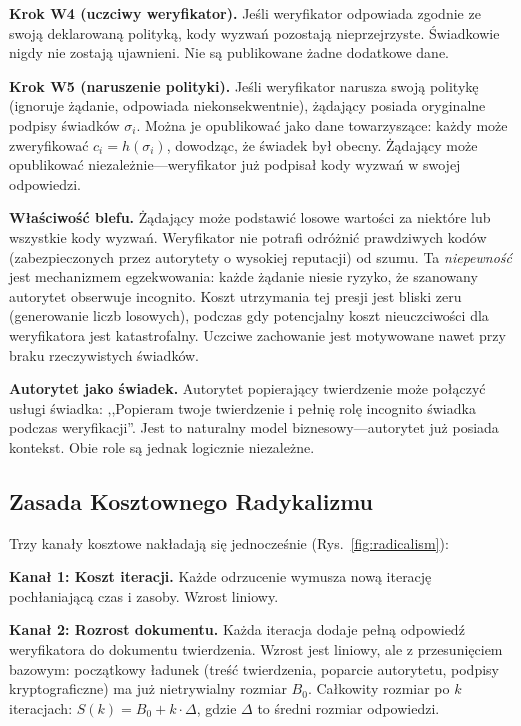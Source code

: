 \documentclass[11pt,a4paper,twocolumn]{article}
\begin{document}
\textbf{Krok W4 (uczciwy weryfikator).} Jeśli weryfikator odpowiada zgodnie ze swoją deklarowaną polityką, kody wyzwań pozostają nieprzejrzyste. Świadkowie nigdy nie zostają ujawnieni. Nie są publikowane żadne dodatkowe dane.

\textbf{Krok W5 (naruszenie polityki).} Jeśli weryfikator narusza swoją politykę (ignoruje żądanie, odpowiada niekonsekwentnie), żądający posiada oryginalne podpisy świadków $\sigma_i$. Można je opublikować jako dane towarzyszące: każdy może zweryfikować $c_i = h(\sigma_i)$, dowodząc, że świadek był obecny. Żądający może opublikować niezależnie---weryfikator już podpisał kody wyzwań w swojej odpowiedzi.

\textbf{Właściwość blefu.} Żądający może podstawić losowe wartości za niektóre lub wszystkie kody wyzwań. Weryfikator nie potrafi odróżnić prawdziwych kodów (zabezpieczonych przez autorytety o wysokiej reputacji) od szumu. Ta \emph{niepewność} jest mechanizmem egzekwowania: każde żądanie niesie ryzyko, że szanowany autorytet obserwuje incognito. Koszt utrzymania tej presji jest bliski zeru (generowanie liczb losowych), podczas gdy potencjalny koszt nieuczciwości dla weryfikatora jest katastrofalny. Uczciwe zachowanie jest motywowane nawet przy braku rzeczywistych świadków.

\textbf{Autorytet jako świadek.} Autorytet popierający twierdzenie może połączyć usługi świadka: ,,Popieram twoje twierdzenie i pełnię rolę incognito świadka podczas weryfikacji''. Jest to naturalny model biznesowy---autorytet już posiada kontekst. Obie role są jednak logicznie niezależne.

\subsection{Zasada Kosztownego Radykalizmu}

Trzy kanały kosztowe nakładają się jednocześnie (Rys.~\ref{fig:radicalism}):

\textbf{Kanał 1: Koszt iteracji.} Każde odrzucenie wymusza nową iterację pochłaniającą czas i zasoby. Wzrost liniowy.

\textbf{Kanał 2: Rozrost dokumentu.} Każda iteracja dodaje pełną odpowiedź weryfikatora do dokumentu twierdzenia. Wzrost jest liniowy, ale z przesunięciem bazowym: początkowy ładunek (treść twierdzenia, poparcie autorytetu, podpisy kryptograficzne) ma już nietrywialny rozmiar $B_0$. Całkowity rozmiar po $k$ iteracjach: $S(k) = B_0 + k \cdot \Delta$, gdzie $\Delta$ to średni rozmiar odpowiedzi.
\end{document}
